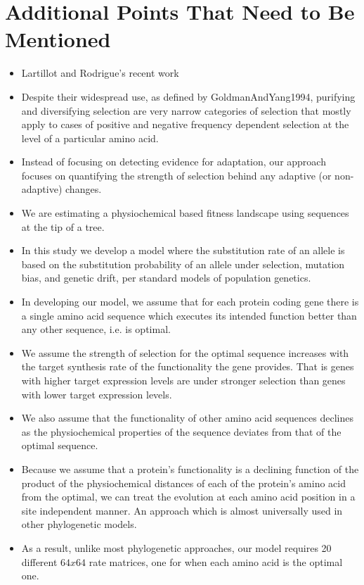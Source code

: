 \documentclass{article}
\begin{document}
\section*{Additional Points That Need to Be Mentioned}
\begin{itemize}
\item Lartillot and Rodrigue's recent work
\item Despite their widespread use, as defined by GoldmanAndYang1994, purifying and diversifying selection are very narrow categories of selection that mostly apply to cases of positive and negative frequency dependent selection at the level of a particular amino acid.
\item Instead of focusing on detecting evidence for adaptation, our approach focuses on quantifying the strength of selection behind any adaptive (or non-adaptive) changes.
\item We are estimating a physiochemical based fitness landscape using sequences at the tip of a tree.
\item In this study we develop a model where the substitution rate of an allele is based on the substitution probability of an allele under selection, mutation bias, and genetic drift, per standard models of population genetics.
\item In developing our model, we assume that for each protein coding gene there is a single amino acid sequence which executes its intended function better than any other sequence, i.e. is optimal.
\item We assume the strength of selection for the optimal sequence increases with the target synthesis rate of the functionality the gene provides.
That is genes with higher target expression levels are under stronger selection than genes with lower target expression levels.
\item We also assume that the functionality of other amino acid sequences declines as the physiochemical properties of the sequence deviates from that of the optimal sequence.
\item Because we assume that a protein's functionality is a declining function of the product of the physiochemical distances of each of the protein's amino acid from the optimal, we can treat the evolution at each amino acid position in a site independent manner. 
An approach which is almost universally used in other phylogenetic models.
\item As a result, unlike most phylogenetic approaches, our model requires 20 different $64 x 64$ rate matrices, one for when each amino acid is the optimal one.

\end{itemize}
\end{document}
